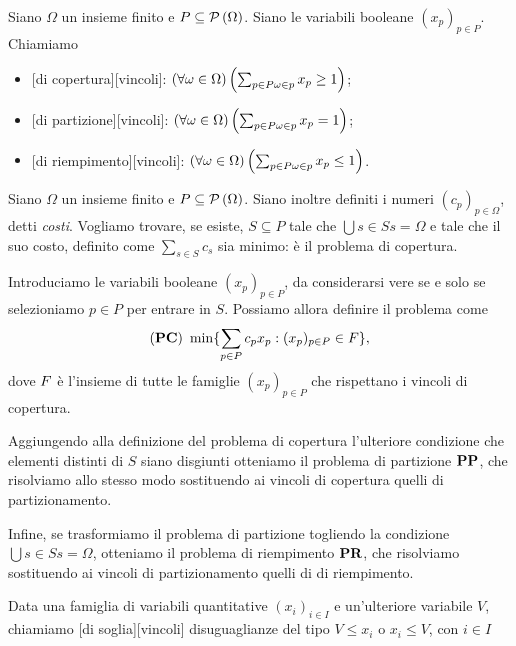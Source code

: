 \begin{Definition}
	Siano $\Omega$ un insieme finito e $P \subseteq \mathcal{P} \left (\Omega \right )$. Siano le variabili booleane $(x_p)_{p \in P}$. Chiamiamo
	\begin{itemize}
		\item {}[di copertura][vincoli]: $\left ( \forall \omega \in \Omega \right ) \left ( \sum_{p \in P\\\omega \in p} x_p \geq 1 \right )$;
		\item {}[di partizione][vincoli]: $\left ( \forall \omega \in \Omega \right ) \left ( \sum_{p \in P\\\omega \in p} x_p = 1 \right )$;
		\item {}[di riempimento][vincoli]: $\left ( \forall \omega \in \Omega \right ) \left ( \sum_{p \in P\\\omega \in p} x_p \leq 1 \right )$.
	\end{itemize}
\end{Definition}
\begin{Example}
	 Siano $\Omega$ un insieme finito e $P \subseteq \mathcal{P} \left (\Omega \right )$. Siano inoltre definiti i numeri $(c_p)_{p \in \Omega}$, detti \emph{costi}. Vogliamo trovare, se esiste, $S \subseteq P$ tale che $\bigcup{s \in S}s = \Omega$ e tale che il suo costo, definito come $\sum_{s \in S} c_s$ sia minimo: \`e il problema di copertura.
	\par Introduciamo le variabili booleane $(x_p)_{p \in P}$, da considerarsi vere se e solo se selezioniamo $p \in P$ per entrare in $S$. Possiamo allora definire il problema come
$$(\textbf{PC})\ \min \lbrace \sum_{p \in P} c_p x_p: (x_p)_{p \in P} \in F \rbrace,$$
	dove $F$ \`e l'insieme di tutte le famiglie $(x_p)_{p \in P}$ che rispettano i vincoli di copertura.
	\par Aggiungendo alla definizione del problema di copertura l'ulteriore condizione che elementi distinti di $S$ siano disgiunti otteniamo il problema di partizione $\textbf{PP}$, che risolviamo allo stesso modo sostituendo ai vincoli di copertura quelli di partizionamento.
	\par Infine, se trasformiamo il problema di partizione togliendo la condizione $\bigcup{s \in S}s = \Omega$, otteniamo il problema di riempimento $\textbf{PR}$, che risolviamo sostituendo ai vincoli di partizionamento quelli di di riempimento.
\end{Example}
\begin{Definition}
	Data una famiglia di variabili quantitative $(x_i)_{i \in I}$ e un'ulteriore variabile $V$, chiamiamo [di soglia][vincoli] disuguaglianze del tipo $V \leq x_i$ o $x_i \leq V$, con $i \in I$
\end{Definition}
